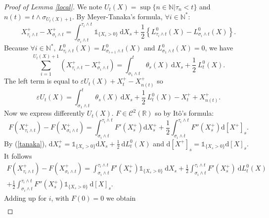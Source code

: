 \documentclass[11pt]{article}
\newcommand{\R}{\mathbb{R}}
\newcommand{\N}{\mathbb{N}}
\newcommand{\di}{\mathrm{d}}
\begin{document}
    \begin{proof}[Proof of Lemma \ref{local}]
        We note $U_t(X) = \sup\{n\in\N|\tau_n<t\}$ and $n(t) = t \wedge \sigma_{U_t(X)+1}$. By Meyer-Tanaka's formula, $\forall i\in \N^*$:        
        \begin{equation}\label{tanaka}
        X^+_{\tau_i\wedge t} - X^+_{\sigma_i\wedge t} = \int_{\sigma_i\wedge t}^{\tau_i\wedge t} \mathds{1}_{\{X_s>0\}}\ \di X_s + \frac{1}{2}\left\{L^0_{\tau_i\wedge t}(X)-L^0_{\sigma_i\wedge t}(X)\right\}.
        \end{equation}        
        Because $\forall i\in\N^*,\ L^0_{\tau_{i}\wedge t}(X)=L^0_{\sigma_{i+1}\wedge t}(X)$ and $L^0_{\sigma_1\wedge t}(X)=0$, we have        
        \begin{equation*}
        \sum_{i=1}^{U_t(X)+1}\left(X^+_{\tau_i\wedge t} - X^+_{\sigma_i\wedge t}\right) = \int_{\sigma_1\wedge t}^{t} \theta_s(X)\ \di X_s + \frac{1}{2}\ L^0_{t}(X).
        \end{equation*}
        The left term is equal to $\varepsilon U_t(X)+X^+_t-X^+_{n(t)}$ so
        \begin{equation}\label{Ut}
        \varepsilon U_t(X) = \int_{\sigma_1\wedge t}^{t} \theta_s(X)\ \di X_s + \frac{1}{2}\ L^0_{t}(X) - X^+_t + X^+_{n(t)}.
        \end{equation}
        Now we express differently $U_t(X)$. $F\in\mathcal{C}^2(\R)$ so by Itô's formula:
        \begin{equation*}
        F\left(X^+_{\tau_i\wedge t}\right) - F\left(X^+_{\sigma_i\wedge t}\right) = \int_{\sigma_i\wedge t}^{\tau_i\wedge t} F'\left(X_s^+\right) \di X_s^+ + \frac{1}{2}\int_{\sigma_i\wedge t}^{\tau_i\wedge t} F''\left(X_s^+\right) \di [X^+]_s.
        \end{equation*}
        By (\ref{tanaka}), $\di X_s^+ = \mathds{1}_{\{X_s>0\}}\di X_s + \frac{1}{2}\ \di L^0_t(X)$ and $\di[X^+]_s = \mathds{1}_{\{X_s>0\}}\di[X]_s$. It follows
        \begin{multline*}
        F\left(X^+_{\tau_i\wedge t}\right) - F\left(X^+_{\sigma_i\wedge t}\right) = \int_{\sigma_i\wedge t}^{\tau_i\wedge t} F'\left(X_s^+\right) \mathds{1}_{\{X_s>0\}}\ \di X_s + \frac{1}{2}\int_{\sigma_i\wedge t}^{\tau_i\wedge t} F'(X_s^+)\ \di L^0_t(X)\\ + \frac{1}{2}\int_{\sigma_i\wedge t}^{\tau_i\wedge t} F''\left(X_s^+\right) \mathds{1}_{\{X_s>0\}}\ \di [X]_s.
        \end{multline*}
        Adding up for $i$, with $F(0) = 0$ we obtain
        \begin{multline*}

\end{multline*}
\end{proof}
\end{document}
